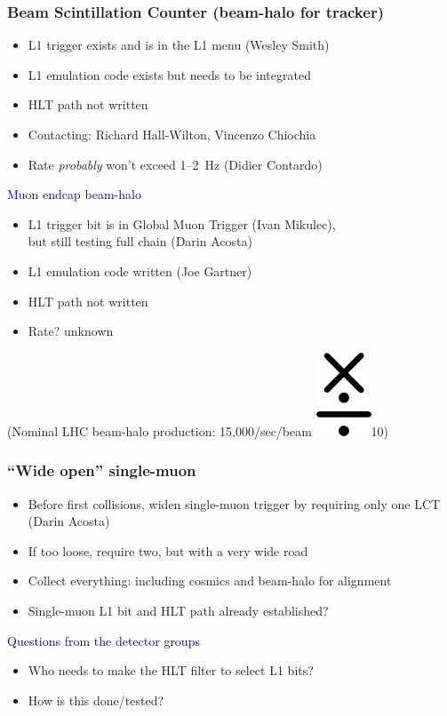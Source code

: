 \documentclass[compress]{beamer}
\begin{document}
\begin{frame}
\frametitle{Beam Scintillation Counter (beam-halo for tracker)}
\begin{itemize}\setlength{\itemsep}{0.15 cm}
\item L1 trigger exists and is in the L1 menu (Wesley Smith)
\item L1 emulation code exists but needs to be integrated
\item HLT path not written
\item Contacting: Richard Hall-Wilton, Vincenzo Chiochia
\item Rate {\it probably} won't exceed 1--2~Hz (Didier Contardo)
\end{itemize}

\vfill
\hspace{-0.83 cm} \textcolor{darkblue}{\Large Muon endcap beam-halo}

\vfill
\begin{itemize}\setlength{\itemsep}{0.15 cm}
\item L1 trigger bit is in Global Muon Trigger (Ivan Mikulec), \\ but still testing full chain (Darin Acosta)
\item L1 emulation code written (Joe Gartner)
\item HLT path not written
\item Rate?  unknown
\end{itemize}

\vfill
(Nominal LHC beam-halo production: 15,000/sec/beam \includegraphics[height=0.5\baselineskip]{timesdiv.png}10)
\end{frame}

\begin{frame}
\frametitle{``Wide open'' single-muon}
\begin{itemize}\setlength{\itemsep}{0.25 cm}
\item Before first collisions, widen single-muon trigger by requiring only one LCT (Darin Acosta)
\item If too loose, require two, but with a very wide road
\item Collect everything: including cosmics and beam-halo for alignment
\item Single-muon L1 bit and HLT path already established?
\end{itemize}

\vfill
\hspace{-0.83 cm} \textcolor{darkblue}{\Large Questions from the detector groups}

\vfill
\begin{itemize}\setlength{\itemsep}{0.25 cm}
\item Who needs to make the HLT filter to select L1 bits?
\item How is this done/tested?
\end{itemize}
\end{frame}
\end{document}
